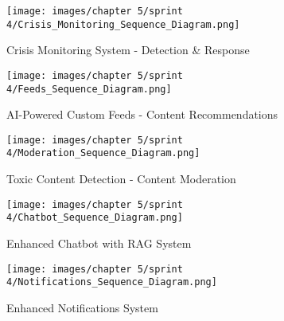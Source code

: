 \begin{figure}[H]
    \centering
    \texttt{[image: images/chapter 5/sprint 4/Crisis\_Monitoring\_Sequence\_Diagram.png]}
    \caption{Crisis Monitoring System - Detection \& Response}
    \label{fig:crisis-monitoring-sequence-diagram}
\end{figure}

\begin{figure}[H]
    \centering
    \texttt{[image: images/chapter 5/sprint 4/Feeds\_Sequence\_Diagram.png]}
    \caption{AI-Powered Custom Feeds - Content Recommendations}
    \label{fig:feeds-sequence-diagram}
\end{figure}

\begin{figure}[H]
    \centering
    \texttt{[image: images/chapter 5/sprint 4/Moderation\_Sequence\_Diagram.png]}
    \caption{Toxic Content Detection - Content Moderation}
    \label{fig:moderation-sequence-diagram}
\end{figure}

\begin{figure}[H]
    \centering
    \texttt{[image: images/chapter 5/sprint 4/Chatbot\_Sequence\_Diagram.png]}
    \caption{Enhanced Chatbot with RAG System}
    \label{fig:chatbot-sequence-diagram}
\end{figure}

\begin{figure}[H]
    \centering
    \texttt{[image: images/chapter 5/sprint 4/Notifications\_Sequence\_Diagram.png]}
    \caption{Enhanced Notifications System}
    \label{fig:notifications-sequence-diagram}
\end{figure}
